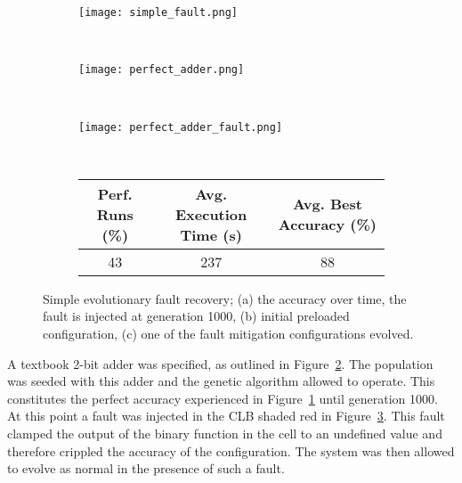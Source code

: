 \begin{figure}
	\centering
	\begin{subfigure}[ht]{0.49\textwidth}
		\texttt{[image: simple\_fault.png]}
		\caption{}
		\label{fig:fault}
		\vspace{1em}
	\end{subfigure}
	\\
	\begin{subfigure}[ht]{0.49\textwidth}
		\texttt{[image: perfect\_adder.png]}
		\caption{}
		\label{fig:perf}
		\vspace{1em}
	\end{subfigure}
	~
	\begin{subfigure}[ht]{0.49\textwidth}
		\texttt{[image: perfect\_adder\_fault.png]}
		\caption{}
		\label{fig:recov}
		\vspace{1em}
	\end{subfigure}
	~
	\begin{subfigure}[ht]{\textwidth}
		\centering
		\begin{tabular}{ccc}
			\toprule
			\bfseries{Perf. Runs (\%)} &
			\bfseries{Avg. Execution Time (s)} & \bfseries{Avg. Best Accuracy (\%)}\\
			\midrule
			43 & 237 & 88 \\
			\bottomrule
		\end{tabular}
	\end{subfigure}
	\caption[Simple evolutionary fault recovery]{Simple evolutionary fault recovery;
	(a) the accuracy over time, the fault is injected at generation 1000,
	(b) initial preloaded configuration,
	(c) one of the fault mitigation configurations evolved.}
	\label{fig:simple_fault}
\end{figure}

A textbook 2-bit adder was specified, as outlined in Figure~\ref{fig:perf}. The
population was seeded with this adder and the genetic algorithm allowed to operate.
This constitutes the perfect accuracy experienced in Figure~\ref{fig:fault} until generation
1000.
At this point a fault was injected in the CLB shaded red in Figure~\ref{fig:recov}.
This fault clamped the output of the binary function in the cell to an undefined
value and therefore crippled the accuracy of the configuration. The system was then
allowed to evolve as normal in the presence of such a fault.

